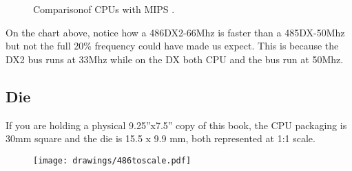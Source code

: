 \begin{figure}[H]
\centering
   \caption{Comparison\protect\footnotemark of CPUs with MIPS \protect\footnotemark.}
 \end{figure}
\par
On the chart above, notice how a 486DX2-66Mhz is faster than a 485DX-50Mhz but not the full 20\% frequency could have made us expect. This is because the DX2 bus runs at 33Mhz while on the DX both CPU and the bus run at 50Mhz.




\subsection{Die}
If you are holding a physical 9.25''x7.5'' copy of this book, the CPU packaging is 30mm square and the die is 15.5 x 9.9 mm, both represented at 1:1 scale.\\
\par
\bigskip

  \begin{figure}[!htb]

\begin{minipage}{0.48\textwidth}
\centering
{}
\end{minipage}
\hfill
\begin{minipage}{0.48\textwidth}
\centering
\texttt{[image: drawings/486toscale.pdf]}
\end{minipage}
\end{figure}

